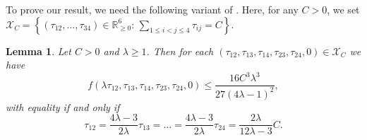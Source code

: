\documentclass[twoside]{amsart}
\newtheorem{lem}{Lemma}
\theoremstyle{definition}
\renewcommand{\Re}{\mathbb R}
\newcommand{\X}{\mathcal{X}}
\begin{document}

To prove our result, we need the following variant of \cite[Lemma 5]{Langi}.  Here, for any $C > 0$, we set
$\X_C = \left\{(\tau_{12}, \dots, \tau_{34}) \in \Re^6_{\geq 0}: \, \sum_{1 \leq i < j \leq 4} \tau_{ij} = C\right\}$.


\begin{lem}\label{lem:computations2}
Let $C > 0$ and $\lambda \geq 1$. Then for each $(\tau_{12},\tau_{13},\tau_{14},\tau_{23},\tau_{24},0)\in \mathcal{X}_C$ we have 
\begin{equation}\label{ineq:g}
 f(\lambda \tau_{12},\tau_{13},\tau_{14},\tau_{23},\tau_{24},0) \leq \frac{16C^3 \lambda^3}{27(4\lambda - 1)^2},
\end{equation}
with equality if and only if
\[
\tau_{12} = \frac{4 \lambda - 3}{2\lambda}\tau_{13} = \ldots = \frac{4 \lambda - 3}{2\lambda} \tau_{24} = \frac{2 \lambda}{12 \lambda - 3}C.
\]
\end{lem}
\end{document}
